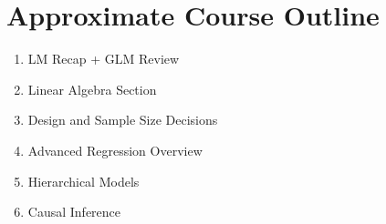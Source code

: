 \documentclass[11pt,]{article}
\providecommand{\tightlist}{%
  \setlength{\itemsep}{0pt}\setlength{\parskip}{0pt}}
\begin{document}
\hypertarget{approximate-course-outline}{%
\section{Approximate Course Outline}\label{approximate-course-outline}}

\begin{enumerate}
\def\labelenumi{\arabic{enumi}.}
\tightlist
\item
  LM Recap + GLM Review
\item
  Linear Algebra Section
\item
  Design and Sample Size Decisions
\item
  Advanced Regression Overview
\item
  Hierarchical Models
\item
  Causal Inference
\end{enumerate}
\end{document}
